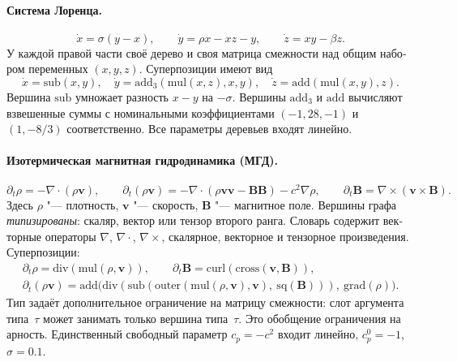 \documentclass[12pt]{article}
\newif\ifhighlight \highlighttrue
\newenvironment{ru}{\begin{otherlanguage}{russian}\ifhighlight\color{blue}\fi}{\end{otherlanguage}}
\begin{document}
\begin{ru}
\paragraph{Система Лоренца.}
\begin{equation}\label{eq:lorenz}
\dot x=\sigma(y-x),\qquad \dot y=\rho x-xz-y,\qquad \dot z=xy-\beta z.
\end{equation}
У каждой правой части своё дерево и своя матрица смежности над общим набором переменных $(x,y,z)$. Суперпозиции имеют вид
\[
\dot x=\mathrm{sub}(x,y),\quad
\dot y=\mathrm{add}_3(\mathrm{mul}(x,z),x,y),\quad
\dot z=\mathrm{add}(\mathrm{mul}(x,y),z).
\]
Вершина $\mathrm{sub}$ умножает разность $x-y$ на $-\sigma$. Вершины $\mathrm{add}_3$ и $\mathrm{add}$ вычисляют взвешенные суммы с номинальными коэффициентами $(-1,28,-1)$ и $(1,-8/3)$ соответственно. Все параметры деревьев входят линейно.

\paragraph{Изотермическая магнитная гидродинамика (МГД).}
\[
\partial_t\rho=-\nabla\!\cdot(\rho\mathbf v),\qquad
\partial_t(\rho\mathbf v)=-\nabla\!\cdot(\rho\mathbf v\mathbf v-\mathbf B\mathbf B)-c^2\nabla\rho,\qquad
\partial_t\mathbf B=\nabla\times(\mathbf v\times\mathbf B).
\]
Здесь $\rho$ "--- плотность, $\mathbf v$ "--- скорость, $\mathbf B$ "--- магнитное поле. Вершины графа \emph{типизированы}: скаляр, вектор или тензор второго ранга. Словарь содержит векторные операторы $\nabla$, $\nabla\cdot$, $\nabla\times$, скалярное, векторное и тензорное произведения. Суперпозиции:
\begin{gather*}
\partial_t\rho=\mathrm{div}(\mathrm{mul}(\rho,\mathbf v)),\qquad
\partial_t\mathbf B=\mathrm{curl}(\mathrm{cross}(\mathbf v,\mathbf B)),\\
\partial_t(\rho\mathbf v)=\mathrm{add}\bigl(\mathrm{div}(\mathrm{sub}(\mathrm{outer}(\mathrm{mul}(\rho,\mathbf v),\mathbf v),\ \mathrm{sq}(\mathbf B))),\ \mathrm{grad}(\rho)\bigr).
\end{gather*}
Тип задаёт дополнительное ограничение на матрицу смежности: слот аргумента типа~$\tau$ может занимать только вершина типа~$\tau$. Это обобщение ограничения на арность. Единственный свободный параметр $c_p=-c^2$ входит линейно, $c_p^0=-1$, $\sigma=0.1$.

\end{ru}
\end{document}
